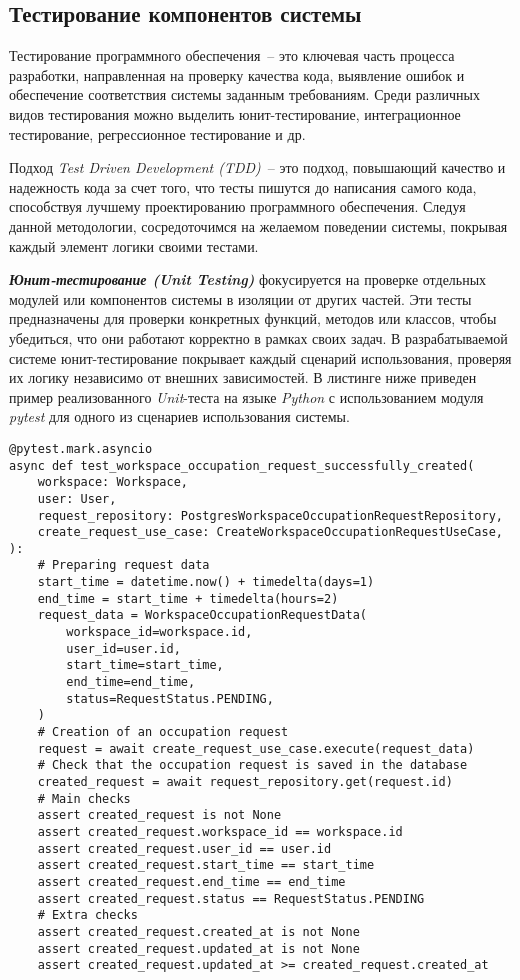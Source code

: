 \subsection{Тестирование компонентов системы}
\label{sub:system-implementation:testing}

Тестирование программного обеспечения~-- это ключевая часть процесса разработки, направленная на проверку качества кода, выявление ошибок и обеспечение соответствия системы заданным требованиям. Среди различных видов тестирования можно выделить юнит-тестирование, интеграционное тестирование, регрессионное тестирование и др.

Подход \textit{Test Driven Development (TDD)}~-- это подход, повышающий качество и надежность кода за счет того, что тесты пишутся до написания самого кода, способствуя лучшему проектированию программного обеспечения. Следуя данной методологии, сосредоточимся на желаемом поведении системы, покрывая каждый элемент логики своими тестами.

\textit{\textbf{Юнит-тестирование (Unit Testing)}} фокусируется на проверке отдельных модулей или компонентов системы в изоляции от других частей. Эти тесты предназначены для проверки конкретных функций, методов или классов, чтобы убедиться, что они работают корректно в рамках своих задач. В разрабатываемой системе юнит-тестирование покрывает каждый сценарий использования, проверяя их логику независимо от внешних зависимостей. В листинге ниже приведен пример реализованного \textit{Unit}-теста на языке \textit{Python} с использованием модуля \textit{pytest} для одного из сценариев использования системы.

\begin{lstlisting}[style=pythonstyle]
@pytest.mark.asyncio
async def test_workspace_occupation_request_successfully_created(
    workspace: Workspace,
    user: User,
    request_repository: PostgresWorkspaceOccupationRequestRepository,
    create_request_use_case: CreateWorkspaceOccupationRequestUseCase,
):
    # Preparing request data
    start_time = datetime.now() + timedelta(days=1)
    end_time = start_time + timedelta(hours=2)
    request_data = WorkspaceOccupationRequestData(
        workspace_id=workspace.id,
        user_id=user.id,
        start_time=start_time,
        end_time=end_time,
        status=RequestStatus.PENDING,
    )
    # Creation of an occupation request
    request = await create_request_use_case.execute(request_data)
    # Check that the occupation request is saved in the database
    created_request = await request_repository.get(request.id)
    # Main checks
    assert created_request is not None
    assert created_request.workspace_id == workspace.id
    assert created_request.user_id == user.id
    assert created_request.start_time == start_time
    assert created_request.end_time == end_time
    assert created_request.status == RequestStatus.PENDING
    # Extra checks
    assert created_request.created_at is not None
    assert created_request.updated_at is not None
    assert created_request.updated_at >= created_request.created_at
\end{lstlisting}


